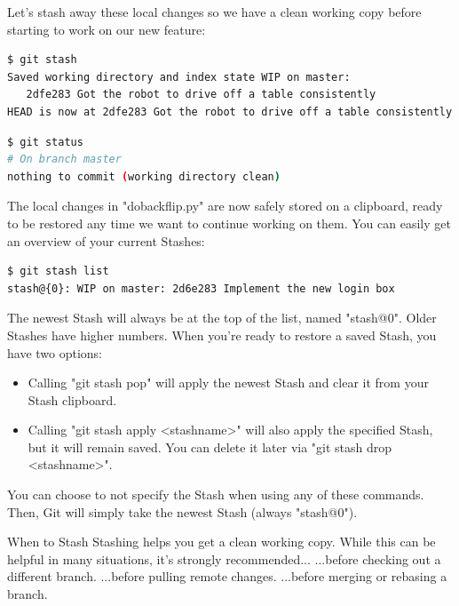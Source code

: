 \documentclass{article}
\begin{document}
Let's stash away these local changes so we have a clean working copy before starting to work on our new feature:

\begin{lstlisting}[language=bash]
$ git stash
Saved working directory and index state WIP on master: 
   2dfe283 Got the robot to drive off a table consistently
HEAD is now at 2dfe283 Got the robot to drive off a table consistently
\end{lstlisting}
\begin{lstlisting}[language=bash]
$ git status
# On branch master
nothing to commit (working directory clean)
\end{lstlisting}
The local changes in "dobackflip.py" are now safely stored on a clipboard, ready to be restored any time we want to continue working on them.
\newline\newline
You can easily get an overview of your current Stashes:
\begin{lstlisting}[language=bash]
$ git stash list
stash@{0}: WIP on master: 2d6e283 Implement the new login box
\end{lstlisting}

The newest Stash will always be at the top of the list, named "stash@{0}". Older Stashes have higher numbers.
\newline\newline
When you're ready to restore a saved Stash, you have two options:
\begin{itemize}
    \item Calling "git stash pop" will apply the newest Stash and clear it from your Stash clipboard.
    \item Calling "git stash apply <stashname>" will also apply the specified Stash, but it will remain saved. You can delete it later via "git stash drop <stashname>".
\end{itemize}

You can choose to not specify the Stash when using any of these commands. Then, Git will simply take the newest Stash (always "stash@{0}").

\begin{concept}
When to Stash
\newline\newline
Stashing helps you get a clean working copy. While this can be helpful in many situations, it's strongly recommended...
\newline\newline
...before checking out a different branch.
\newline
...before pulling remote changes.
\newline
...before merging or rebasing a branch.
\end{concept}
\end{document}
